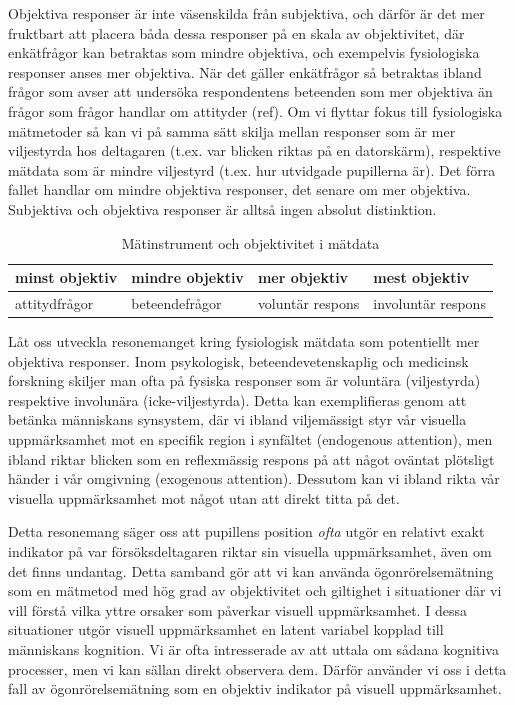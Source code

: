 \documentclass[
]{book}
\begin{document}
Objektiva responser är inte väsenskilda från subjektiva, och därför är det mer fruktbart att placera båda dessa responser på en skala av objektivitet, där enkätfrågor kan betraktas som mindre objektiva, och exempelvis fysiologiska responser anses mer objektiva. När det gäller enkätfrågor så betraktas ibland frågor som avser att undersöka respondentens beteenden som mer objektiva än frågor som frågor handlar om attityder (ref). Om vi flyttar fokus till fysiologiska mätmetoder så kan vi på samma sätt skilja mellan responser som är mer viljestyrda hos deltagaren (t.ex. var blicken riktas på en datorskärm), respektive mätdata som är mindre viljestyrd (t.ex. hur utvidgade pupillerna är). Det förra fallet handlar om mindre objektiva responser, det senare om mer objektiva. Subjektiva och objektiva responser är alltså ingen absolut distinktion.

\begin{table}

\caption{\label{tab:tab02-07-3}Mätinstrument och objektivitet i mätdata}
\centering
\begin{tabular}[t]{llll}
\toprule
minst objektiv & mindre objektiv & mer objektiv & mest objektiv\\
\midrule
attitydfrågor & beteendefrågor & voluntär respons & involuntär respons\\
\bottomrule
\end{tabular}
\end{table}

Låt oss utveckla resonemanget kring fysiologisk mätdata som potentiellt mer objektiva responser. Inom psykologisk, beteendevetenskaplig och medicinsk forskning skiljer man ofta på fysiska responser som är voluntära (viljestyrda) respektive involunära (icke-viljestyrda). Detta kan exemplifieras genom att betänka människans synsystem, där vi ibland viljemässigt styr vår visuella uppmärksamhet mot en specifik region i synfältet (endogenous attention), men ibland riktar blicken som en reflexmässig respons på att något oväntat plötsligt händer i vår omgivning (exogenous attention). Dessutom kan vi ibland rikta vår visuella uppmärksamhet mot något utan att direkt titta på det.

Detta resonemang säger oss att pupillens position \emph{ofta} utgör en relativt exakt indikator på var försöksdeltagaren riktar sin visuella uppmärksamhet, även om det finns undantag. Detta samband gör att vi kan använda ögonrörelsemätning som en mätmetod med hög grad av objektivitet och giltighet i situationer där vi vill förstå vilka yttre orsaker som påverkar visuell uppmärksamhet. I dessa situationer utgör visuell uppmärksamhet en latent variabel kopplad till människans kognition. Vi är ofta intresserade av att uttala om sådana kognitiva processer, men vi kan sällan direkt observera dem. Därför använder vi oss i detta fall av ögonrörelsemätning som en objektiv indikator på visuell uppmärksamhet.
\end{document}
